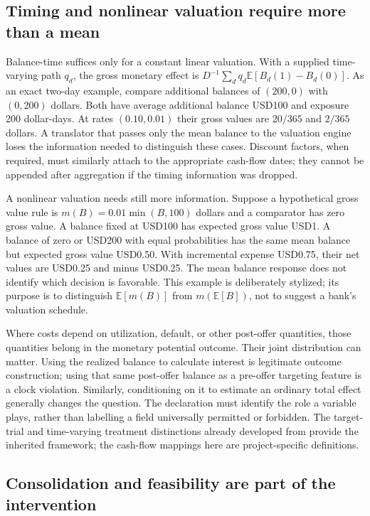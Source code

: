 \subsection{Timing and nonlinear valuation require more than a mean}

Balance-time suffices only for a constant linear valuation. With a supplied
time-varying path $q_d$, the gross monetary effect is
$D^{-1}\sum_d q_d\mathbb E[B_d(1)-B_d(0)]$. As an exact two-day example,
compare additional balances of $(200,0)$ with $(0,200)$ dollars. Both have
average additional balance USD100 and exposure 200 dollar-days. At rates
$(0.10,0.01)$ their gross values are $20/365$ and $2/365$ dollars. A translator
that passes only the mean balance to the valuation engine loses the
information needed to distinguish these cases. Discount factors, when
required, must similarly attach to the appropriate cash-flow dates; they
cannot be appended after aggregation if the timing information was dropped.

A nonlinear valuation needs still more information. Suppose a hypothetical
gross value rule is $m(B)=0.01\min(B,100)$ dollars and a comparator has zero
gross value. A balance fixed at USD100 has expected gross value USD1.
A balance of zero or USD200 with equal probabilities has the same mean
balance but expected gross value USD0.50. With incremental expense USD0.75,
their net values are USD0.25 and minus USD0.25. The mean balance response
does not identify which decision is favorable. This example is deliberately
stylized; its purpose is to distinguish $\mathbb E[m(B)]$ from
$m(\mathbb E[B])$, not to suggest a bank's valuation schedule.

Where costs depend on utilization, default, or other post-offer quantities,
those quantities belong in the monetary potential outcome. Their joint
distribution can matter. Using the realized balance to calculate interest
is legitimate outcome construction; using that same post-offer balance as
a pre-offer targeting feature is a clock violation. Similarly, conditioning
on it to estimate an ordinary total effect generally changes the question.
The declaration must identify the role a variable plays, rather than
labelling a field universally permitted or forbidden. The target-trial and
time-varying treatment distinctions already developed from
\citet{hernan2020} provide the inherited framework; the cash-flow mappings
here are project-specific definitions.

\subsection{Consolidation and feasibility are part of the intervention}

